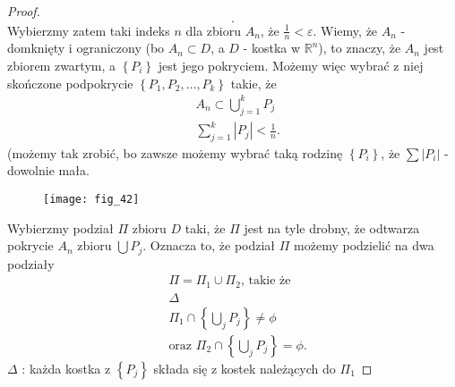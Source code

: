 \documentclass[../main.tex]{subfiles}
\begin{document}
\begin{proof}
\[        .\] Wybierzmy zatem taki indeks $n$ dla zbioru $A_n$, że $\frac{1}{n} < \varepsilon$.
        Wiemy, że $A_n$ - domknięty i ograniczony (bo $A_n \subset D$, a $D$ - kostka w $\mathbb{R}^n$), to znaczy, że $A_n$ jest zbiorem zwartym, a $\left\{ P_i \right\} $ jest jego pokryciem.
        Możemy więc wybrać z niej skończone podpokrycie $\left\{ P_1, P_2, \ldots, P_k \right\} $ takie, że
        \begin{align*}
        &A_n \subset \bigcup_{j=1}^k P_j\\
        &\sum_{j=1}^{k} |P_j| < \frac{1}{n}
        .\end{align*}
        (możemy tak zrobić, bo zawsze możemy wybrać taką rodzinę $\left\{ P_i \right\} $, że $\sum |P_i|$ - dowolnie mała.
        \begin{figure}[h]
            \centering
            \texttt{[image: fig\_42]}
        \end{figure}
        Wybierzmy podział $\Pi$ zbioru $D$ taki, że $\Pi$ jest na tyle drobny, że odtwarza pokrycie $A_n$ zbioru $\bigcup P_j$. Oznacza to, że podział $\Pi$ możemy podzielić na dwa podziały
        \begin{align*}
            &\Pi = \Pi_1 \cup \Pi_2 \text{, takie że}\\
            &\Delta\\
            &\Pi_1 \cap \left\{ \bigcup_{j} P_j \right\} \neq \phi\\
            &\text{oraz } \Pi_2 \cap \left\{ \bigcup_{j} P_j \right\} = \phi
        .\end{align*}
        $\Delta$ : każda kostka z $\left\{ P_j \right\} $ składa się z kostek należących do $\Pi_1$


\end{proof}
\end{document}
